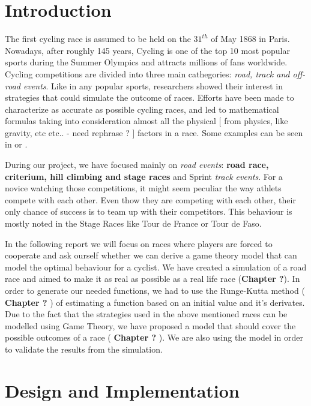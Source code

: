 \documentclass[10pt, a4paper]{report}
\begin{document}
\chapter{Introduction}

The first cycling race is assumed to be held on the $31^{th}$ of May 1868 in Paris. Nowadays, after roughly 145 years, Cycling is one of the top 10 most popular sports during the Summer Olympics \cite{TopEndSportsUrl} and attracts millions of fans worldwide. Cycling competitions are divided into three main cathegories: \textit{road, track and off-road events}. Like in any popular sports, researchers showed their interest in strategies that could simulate the outcome of races. Efforts have been made to characterize as accurate as possible cycling races, and led to mathematical formulas taking into consideration almost all the physical [ from physics, like gravity, etc etc.. - need rephrase ? ] factors in a race. Some examples can be seen in \cite{AgentModel} or \cite{MathematicsOfBreakingAway} .

During our project, we have focused mainly on \textit{road events}: \textbf{road race, criterium, hill climbing and stage races} and Sprint \textit{track events}. For a novice watching those competitions, it might seem peculiar the way athlets compete with each other. Even thow they are competing  with each other, their only chance of success is to team up with their competitors. This behaviour is mostly noted in the Stage Races like Tour de France or Tour de Faso. 

In the following report we will focus on races where players are forced to cooperate and ask ourself  whether we can derive a game theory model that can model the optimal behaviour for a cyclist. We have created a simulation of a road race and aimed to make it as real as possible as a real life race (\textbf{Chapter ?}). In order to generate our needed functions, we had to use the Runge-Kutta method ( \textbf{Chapter ?} ) of estimating a function based on an initial value and it's derivates. Due to the fact that the strategies used in the above mentioned races can be modelled using Game Theory, we have proposed a model that should cover the possible outcomes of a race ( \textbf{Chapter ?} ). We are also using the model in order to validate the results from the simulation.
 

\chapter{Design and Implementation}
\end{document}
